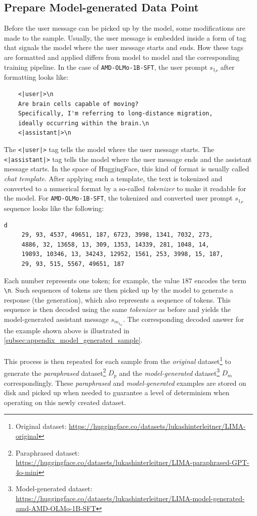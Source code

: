 \subsection{Prepare Model-generated Data Point}\label{subsec:prepare_model_input}
Before the user message can be picked up by the model, some modifications are made to the sample. Usually, the user message is embedded inside a form of tag that signals the model where the user message starts and ends. How these tags are formatted and applied differs from model to model and the corresponding training pipeline. In the case of \texttt{AMD-OLMo-1B-SFT}, the user prompt $s_{1_P}$ after formatting looks like:
\begin{verbatim}
    <|user|>\n
    Are brain cells capable of moving? 
    Specifically, I'm referring to long-distance migration, 
    ideally occurring within the brain.\n
    <|assistant|>\n
\end{verbatim}
The \texttt{<|user|>} tag tells the model where the user message starts. The \texttt{<|assistant|>} tag tells the model where the user message ends and the assistant message starts. In the space of HuggingFace, this kind of format is usually called \emph{chat template}. After applying such a template, the text is tokenized and converted to a numerical format by a so-called \emph{tokenizer} to make it readable for the model. For \texttt{AMD-OLMo-1B-SFT}, the tokenized and converted user prompt $s_{1_P}$ sequence looks like the following:
\begin{verbatim}d
     29, 93, 4537, 49651, 187, 6723, 3998, 1341, 7032, 273,
     4886, 32, 13658, 13, 309, 1353, 14339, 281, 1048, 14,
     19893, 10346, 13, 34243, 12952, 1561, 253, 3998, 15, 187,
     29, 93, 515, 5567, 49651, 187
\end{verbatim}
Each number represents one token; for example, the value $187$ encodes the term \texttt{\textbackslash n}. Such sequences of tokens are then picked up by the model to generate a response (the generation), which also represents a sequence of tokens. This sequence is then decoded using the same \emph{tokenizer} as before and yields the model-generated assistant message $s_{m_{1_G}}$. The corresponding decoded answer for the example shown above is illustrated in \autoref{subsec:appendix_model_generated_sample}.
\\\\
This process is then repeated for each sample from the \emph{original} dataset\footnote{Original dataset: \url{https://huggingface.co/datasets/lukashinterleitner/LIMA-original}} to generate the \emph{paraphrased} dataset\footnote{Paraphrased dataset: \url{https://huggingface.co/datasets/lukashinterleitner/LIMA-paraphrased-GPT-4o-mini}} $D_p$ and the \emph{model-generated} dataset\footnote{Model-generated dataset: \url{https://huggingface.co/datasets/lukashinterleitner/LIMA-model-generated-amd-AMD-OLMo-1B-SFT}} $D_m$ correspondingly. These \emph{paraphrased} and \emph{model-generated} examples are stored on disk and picked up when needed to guarantee a level of determinism when operating on this newly created dataset.


